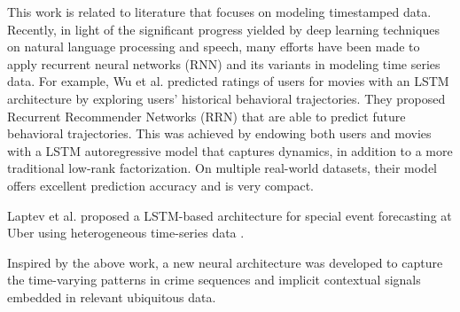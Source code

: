 
\noindent This work is related to literature that focuses on modeling timestamped
 data. Recently, in light of the significant progress yielded 
 by deep learning techniques on natural language processing and speech, many efforts have been made to apply recurrent neural networks (RNN) and its variants in modeling time series data. 
 For example, Wu et al. predicted ratings of users for movies with an LSTM 
 architecture by exploring users’ historical behavioral trajectories. 
 They proposed Recurrent Recommender Networks (RRN) that are able to predict
  future behavioral trajectories. This was achieved by endowing both users and
   movies with a LSTM autoregressive model that captures dynamics, in addition
    to a more traditional low-rank factorization. On multiple real-world datasets, 
    their model offers
excellent prediction accuracy and is very compact.

\noindent Laptev et al. proposed a LSTM-based
architecture for special event forecasting at Uber using heterogeneous 
time-series data \cite{p8}. 

\noindent Inspired by the above work, a new neural architecture was developed to 
capture the time-varying patterns in crime sequences and implicit contextual signals
 embedded in relevant ubiquitous data.


